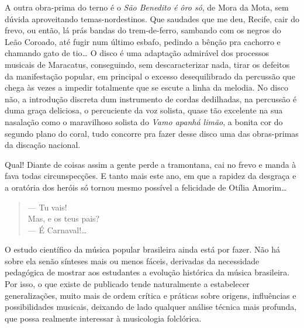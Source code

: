 A outra obra-prima do terno é o \emph{São Benedito é ôro só}, de Mora da
Mota, sem dúvida aproveitando temas-nordestinos. Que saudades que me
deu, Recife, cair do frevo, ou então, lá prás bandas do trem-de-ferro,
sambando com os negros do Leão Coroado, até fugir num último esbafo,
pedindo a bênção pra cachorro e chamando gato de tio\ldots{} O disco é uma
adaptação admirável dos processos musicais de Maracatus, conseguindo,
sem descaracterizar nada, tirar os defeitos da manifestação popular, em
principal o excesso desequilibrado da percussão que chega às vezes a
impedir totalmente que se escute a linha da melodia. No disco não, a
introdução discreta dum instrumento de cordas dedilhadas, na percussão é
duma graça deliciosa, o percuciente da voz solista, quase tão excelente
na sua nasalação como o maravilhoso solista do \emph{Vamo apanhá limão},
a bonita cor do segundo plano do coral, tudo concorre pra fazer desse
disco uma das obras-primas da discação nacional.

Qual! Diante de coisas assim a gente perde a tramontana, cai no frevo e
manda à fava todas circunspecções. E tanto mais este ano, em que a
rapidez da desgraça e a oratória dos heróis só tornou mesmo possível a
felicidade de Otília Amorim\ldots{}

\begin{verse}
--- Tu vais!\\
Mas, e os teus pais?\\
--- É Carnaval!\ldots{}
\end{verse}



O estudo científico da música popular brasileira ainda está por fazer.
Não há sobre ela senão sínteses mais ou menos fáceis, derivadas da
necessidade pedagógica de mostrar aos estudantes a evolução histórica da
música brasileira. Por isso, o que existe de publicado tende
naturalmente a estabelecer generalizações, muito mais de ordem crítica e
práticas sobre origens, influências e possibilidades musicais, deixando
de lado qualquer análise técnica mais profunda, que possa realmente
interessar à musicologia folclórica.

